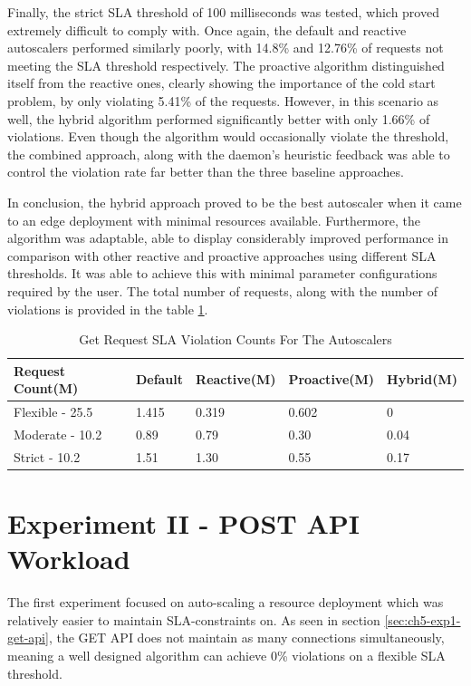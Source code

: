 Finally, the strict SLA threshold of 100 milliseconds was tested, which proved extremely difficult to comply with. Once again, the default and reactive autoscalers performed similarly poorly, with 14.8\% and 12.76\% of requests not meeting the SLA threshold respectively. The proactive algorithm distinguished itself from the reactive ones, clearly showing the importance of the cold start problem, by only violating 5.41\% of the requests. However, in this scenario as well, the hybrid algorithm performed significantly better with only 1.66\% of violations. Even though the algorithm would occasionally violate the threshold, the combined approach, along with the daemon's heuristic feedback was able to control the violation rate far better than the three baseline approaches.\par

In conclusion, the hybrid approach proved to be the best autoscaler when it came to an edge deployment with minimal resources available. Furthermore, the algorithm was adaptable, able to display considerably improved performance in comparison with other reactive and proactive approaches using different SLA thresholds. It was able to achieve this with minimal parameter configurations required by the user. The total number of requests, along with the number of violations is provided in the table \ref{tab:exp1-sla-violation-count}.

\begin{table}
    \caption{Get Request SLA Violation Counts For The Autoscalers}\label{tab:exp1-sla-violation-count}
    \centering
    \begin{tabular}{|l|l|l|l|l|}
        \hline
        Request Count(M) & Default & Reactive(M) & Proactive(M) & Hybrid(M)\\
        \hline
        Flexible - 25.5  & 1.415 & 0.319 & 0.602 & 0\\
        Moderate - 10.2 & 0.89 & 0.79 & 0.30 & 0.04\\
        Strict - 10.2 & 1.51 & 1.30 & 0.55 & 0.17\\
        \hline
    \end{tabular}
\end{table}


\section{Experiment II - POST API Workload}
\label{sec:ch5-exp2-post-api}

The first experiment focused on auto-scaling a resource deployment which was relatively easier to maintain SLA-constraints on. As seen in section \ref{sec:ch5-exp1-get-api}, the GET API does not maintain as many connections simultaneously, meaning a well designed algorithm can achieve 0\% violations on a flexible SLA threshold. \par

